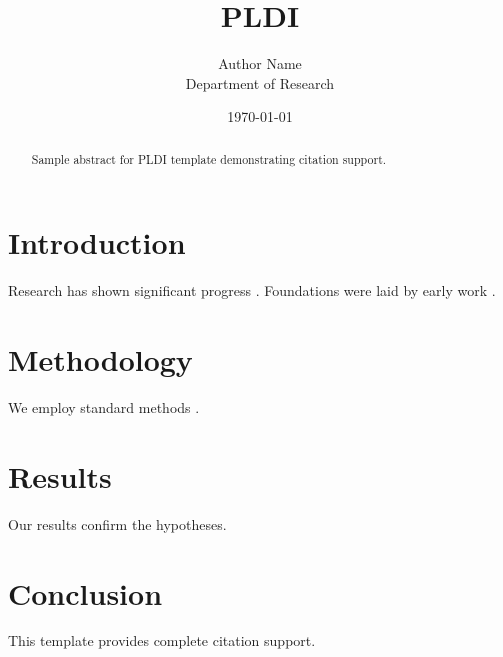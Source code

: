 \documentclass{article}
\title{PLDI}
\author{Author Name \\ \small Department of Research}
\date{\today}
\begin{document}
\maketitle

\begin{abstract}
Sample abstract for PLDI template demonstrating citation support.
\end{abstract}

\section{Introduction}
Research has shown significant progress \citep{einstein1905}. Foundations were laid by early work \citep{turing1950}.

\section{Methodology}
We employ standard methods \citep{knuth1984}.

\section{Results}
Our results confirm the hypotheses.

\section{Conclusion}
This template provides complete citation support.



\end{document}
